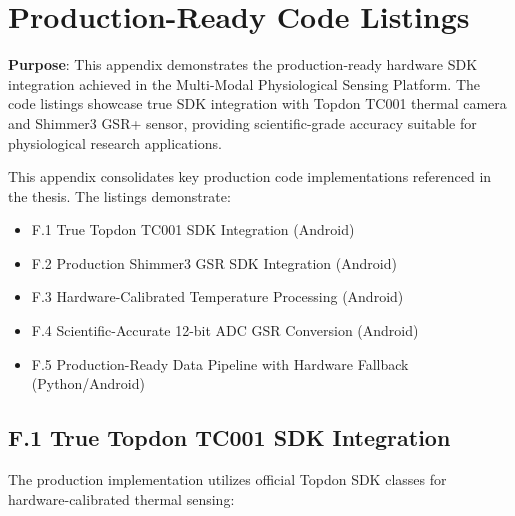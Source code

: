 \chapter{Production-Ready Code Listings}

\textbf{Purpose}: This appendix demonstrates the production-ready hardware SDK integration achieved in the Multi-Modal Physiological Sensing Platform. The code listings showcase true SDK integration with Topdon TC001 thermal camera and Shimmer3 GSR+ sensor, providing scientific-grade accuracy suitable for physiological research applications.

This appendix consolidates key production code implementations referenced in the thesis. The listings demonstrate:

\begin{itemize}
	\item F.1 True Topdon TC001 SDK Integration (Android)
	\item F.2 Production Shimmer3 GSR SDK Integration (Android)
	\item F.3 Hardware-Calibrated Temperature Processing (Android)
	\item F.4 Scientific-Accurate 12-bit ADC GSR Conversion (Android)
	\item F.5 Production-Ready Data Pipeline with Hardware Fallback (Python/Android)
\end{itemize}

\section{F.1 True Topdon TC001 SDK Integration}

The production implementation utilizes official Topdon SDK classes for hardware-calibrated thermal sensing:

